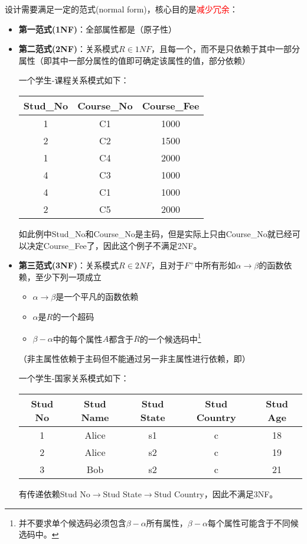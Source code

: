 设计需要满足一定的范式(normal form)，核心目的是\textcolor{red}{减少冗余}：
\begin{itemize}
	\item \textbf{第一范式(1NF)}：全部属性都是（原子性）

	\item \textbf{第二范式(2NF)}：关系模式$R\in 1NF$，且每一个，而不是只依赖于其中一部分属性（即其中一部分属性的值即可确定该属性的值，部分依赖）
	\begin{example}
	一个学生-课程关系模式如下：
	\begin{center}
	\begin{tabular}{|c|c|c|}\hline
		Stud\_No & Course\_No & Course\_Fee\\\hline
		1 & C1 & 1000\\
		2 & C2 & 1500\\
		1 & C4 & 2000\\
		4 & C3 & 1000\\
		4 & C1 & 1000\\
		2 & C5 & 2000\\\hline
	\end{tabular}
	\end{center}
	如此例中Stud\_No和Course\_No是主码，但是实际上只由Course\_No就已经可以决定Course\_Fee了，因此这个例子不满足2NF。
	\end{example}

	\item \textbf{第三范式(3NF)}：关系模式$R\in 2NF$，且对于$F^+$中所有形如$\alpha\to\beta$的函数依赖，至少下列一项成立
	\begin{itemize}
		\item $\alpha\to\beta$是一个平凡的函数依赖
		\item $\alpha$是$R$的一个超码
		\item $\beta-\alpha$中的每个属性$A$都含于$R$的一个候选码中\footnote{并不要求单个候选码必须包含$\beta-\alpha$所有属性，$\beta-\alpha$每个属性可能含于不同候选码中。}
	\end{itemize}
	（非主属性依赖于主码但不能通过另一非主属性进行依赖，即）
	\begin{example}
	一个学生-国家关系模式如下：
	\begin{center}
	\begin{tabular}{ccccc}\hline
	Stud No & Stud Name & Stud State & Stud Country & Stud Age\\\hline
	1 & Alice & s1 & c & 18\\
	2 & Alice & s2 & c & 19\\
	3 & Bob & s2 & c & 21\\\hline
	\end{tabular}
	\end{center}
	有传递依赖Stud No$\to$Stud State$\to$Stud Country，因此不满足3NF。
	\end{example}


\end{itemize}
